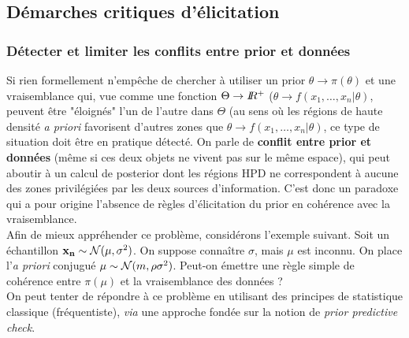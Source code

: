 \subsection{Démarches critiques d'élicitation}

\subsubsection{Détecter et limiter les conflits entre prior et données }

Si rien formellement n'empêche de chercher à utiliser un prior $\theta\to \pi(\theta)$ et une vraisemblance qui, vue comme une fonction $\Theta\to I\!\!R^+$ ($\theta\to f(x_1,\ldots,x_n|\theta)$, peuvent être "éloignés" l'un de l'autre dans $\Theta$ (au sens où les régions de haute densité {\it a priori} favorisent d'autres zones que $\theta\to f(x_1,\ldots,x_n|\theta)$, ce type de situation doit être en pratique détecté. On parle de {\bf conflit entre prior et données} (même si ces deux objets ne vivent pas sur le même espace), qui peut aboutir à un calcul de posterior dont les régions HPD ne correspondent à aucune des zones privilégiées par les deux sources d'information. C'est donc un paradoxe qui a pour origine l'absence de règles d'élicitation du prior en cohérence avec la vraisemblance. \\

Afin de mieux appréhender ce problème, considérons l'exemple suivant. Soit un échantillon ${\bf x_n} \sim {\cal{N}}(\mu,\sigma^2)$. On suppose conna\^itre $\sigma$, mais $\mu$ est inconnu. On place l'{\it a priori} conjugué $\mu\sim{\cal{N}}(m,\rho\sigma^2)$. Peut-on émettre une règle simple de cohérence entre $\pi(\mu)$ et la vraisemblance des données ?   \\

On peut tenter de répondre à ce problème en utilisant des principes de statistique classique (fréquentiste), {\it via} une approche fondée sur la notion de {\it prior predictive check}.


